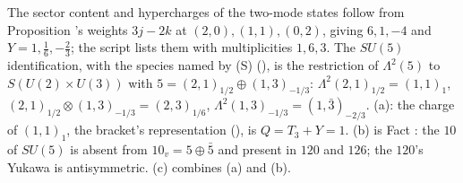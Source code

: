 The sector content and hypercharges of the two-mode states follow from Proposition 's weights $3j - 2k$ at $(2,0), (1,1), (0,2)$, giving $6, 1, -4$ and $Y = 1, \tfrac16, -\tfrac23$; the script lists them with multiplicities $1, 6, 3$. The $SU(5)$ identification, with the species named by (S) (), is the restriction of $\Lambda^{2}(5)$ to $S(U(2) \times U(3))$ with $5 = (2,1)_{1/2} \oplus (1,3)_{-1/3}$: $\Lambda^{2}(2,1)_{1/2} = (1,1)_{1}$, $(2,1)_{1/2} \otimes (1,3)_{-1/3} = (2,3)_{1/6}$, $\Lambda^{2}(1,3)_{-1/3} = (1,\bar{3})_{-2/3}$. (a): the charge of $(1,1)_{1}$, the bracket's representation (), is $Q = T_{3} + Y = 1$. (b) is Fact : the $10$ of $SU(5)$ is absent from $10_{v} = 5 \oplus \bar{5}$ and present in $120$ and $126$; the $120$'s Yukawa is antisymmetric. (c) combines (a) and (b).
